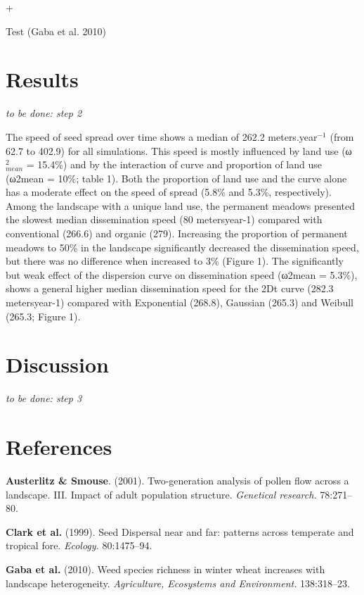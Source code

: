 +\documentclass[12pt]{article}
\begin{document}
Test (Gaba et al. 2010)

\section{Results}\label{results}

\emph{to be done: step 2}

The speed of seed spread over time shows a median of 262.2
meters.year\(^{-1}\) (from 62.7 to 402.9) for all simulations. This
speed is mostly influenced by land use (ω\(^2_{mean}\) = 15.4\%) and by
the interaction of curve and proportion of land use (ω2mean = 10\%;
table 1). Both the proportion of land use and the curve alone has a
moderate effect on the speed of spread (5.8\% and 5.3\%, respectively).
Among the landscape with a unique land use, the permanent meadows
presented the slowest median dissemination speed (80 metersyear-1)
compared with conventional (266.6) and organic (279). Increasing the
proportion of permanent meadows to 50\% in the landscape significantly
decreased the dissemination speed, but there was no difference when
increased to 3\% (Figure 1). The significantly but weak effect of the
dispersion curve on dissemination speed (ω2mean = 5.3\%), shows a
general higher median dissemination speed for the 2Dt curve (282.3
metersyear-1) compared with Exponential (268.8), Gaussian (265.3) and
Weibull (265.3; Figure 1).

\section{Discussion}\label{discussion}

\emph{to be done: step 3}

\section*{References}\label{references}

\hypertarget{refs}{}
\hypertarget{ref-Austerlitz2001}{}
\textbf{Austerlitz \& Smouse}. (2001). Two-generation analysis of pollen
flow across a landscape. III. Impact of adult population structure.
\emph{Genetical research.} 78:271--80.

\hypertarget{ref-Clark1999}{}
\textbf{Clark et al.} (1999). Seed Dispersal near and far: patterns
across temperate and tropical fore. \emph{Ecology.} 80:1475--94.

\hypertarget{ref-Gaba2010}{}
\textbf{Gaba et al.} (2010). Weed species richness in winter wheat
increases with landscape heterogeneity. \emph{Agriculture, Ecosystems
and Environment.} 138:318--23.
\end{document}
